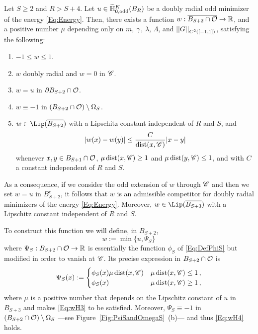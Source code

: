\begin{lemma}
	\label{Lemma:ExistenceCompetitor}
	Let $S\geq 2$ and $R > S + 4$. Let $u\in \widetilde{\mathbb{H}}^K_{0, \mathrm{odd}}(B_R)$ be a doubly radial odd minimizer of the energy \eqref{Eq:Energy}. Then, there exists  a function $w:\overline{ B_{S+2}\cap \mathcal{O}} \to \mathbb{R}$, and a positive number $\mu$ depending only on $m$, $\gamma$, $\lambda$, $\Lambda$, and $\left | \left |{G} \right | \right |_{C^2([-1,1])}$, satisfying the following:
	
	\begin{enumerate}[label={\normalfont (\textcolor{red}{H\arabic*})}, ref=H\arabic*]
	\item
	\label{Eq:wH1} $-1 \leq w \leq 1$.
	\item
	\label{Eq:wH2} $w$ doubly radial and $w=0$ in $\mathscr{C}$.
	\item
	\label{Eq:wH3} $w=u$ in $\partial B_{S+2} \cap \mathcal{O}$.
	\item
	\label{Eq:wH4} $w\equiv-1$ in $(B_{S+2}\cap \mathcal{O})\setminus \Omega_S$.
	\item
	\label{Eq:wH5} $w\in \Lip(\overline{B_{S+2}})$ with a Lipschitz constant independent of $R$ and $S$, and
	$$ |w(x)-w(y)| \leq \frac{C}{\operatorname{dist}(x,\mathscr{C})}|x-y| $$
	whenever $x,y \in B_{S+1}\cap \mathcal{O}$, $\mu \operatorname{dist}(x,\mathscr{C})\geq 1$ and $\mu \operatorname{dist}(y,\mathscr{C})\leq 1$, and with $C$ a constant independent of $R$ and $S$.
	\end{enumerate} 
	
	As a consequence, if we consider the odd extension of $w$ through $\mathscr{C}$ and then we set $w=u$ in $B_{S+2}^c$, it follows that $w$ is an admissible competitor for doubly radial minimizers of the energy \eqref{Eq:Energy}. Moreover, $w\in \Lip(\overline{B_{S+3}})$ with a Lipschitz constant independent of $R$ and $S$.
\end{lemma}


To construct this function we will define, in $B_{S+2}$,
$$
w:= \min \{u, \Psi_S\}\,
$$
where $\Psi_S:B_{S+2} \cap \mathcal{O} \to \mathbb{R}$ is essentially the function $\phi_S$ of \eqref{Eq:DefPhiS} but modified in order to vanish at $\mathscr{C}$. Its precise expression in $B_{S+2}\cap \mathcal{O}$ is
\begin{equation}
\label{Eq:DefPsiS}
\Psi_S(x) :=
\begin{cases}
\phi_S (x) \mu\operatorname{dist}(x,\mathscr{C}) &  \mu\operatorname{dist}(x,\mathscr{C}) \leq 1 \,, \\
\phi_S (x) &  \mu\operatorname{dist}(x,\mathscr{C}) \geq 1\,,
\end{cases}
\end{equation}
where $\mu$ is a positive number that depends on the Lipschitz constant of $u$ in $B_{S+3}$ and makes \eqref{Eq:wH3} to be satisfied. Moreover, $\Psi_S \equiv -1$ in $(B_{S+2}\cap \mathcal{O})\setminus \Omega_S$ ---see Figure~\ref{Fig:PsiSandOmegaS}~(b)--- and thus \eqref{Eq:wH4} holds.

